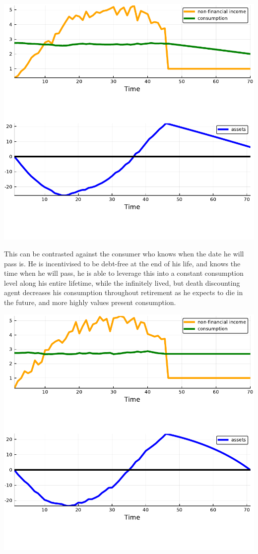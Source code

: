 \documentclass[10pt]{paper}
\begin{document}
\includegraphics[width=\linewidth]{figures/questions_2_1.pdf}


This can be contrasted against the consumer who knows when the date he
will pass is. He is incentivised to be debt-free at the end of his life, and
knows the time when he will pass, he is able to leverage this into a
constant consumption level along his entire lifetime, while the
infinitely lived, but death discounting agent decreases his
consumption throughout retirement as he expects to die in the future,
and more highly values present consumption.


\includegraphics[width=\linewidth]{figures/questions_3_1.pdf}
\end{document}
